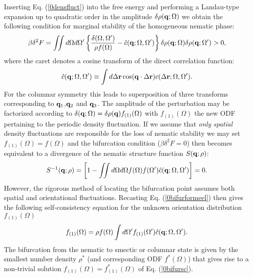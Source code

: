 \documentclass[amssymb]{revtex4}
\newcommand{\bfr}{{\bf r}}
\newcommand{\vq}{{\bf q}}
\begin{document}
Inserting Eq. (\ref{0densfluct}) into the free energy and performing a Landau-type expansion up to quadratic order
in the amplitude $\delta \rho(\vq;\Omega)$ we obtain the following condition for marginal stability of the homogeneous nematic phase: 
\begin{equation}
\beta \delta ^{2} F= \iint d\Omega d\Omega^{\prime} \left\{
\frac{\delta(\Omega,\Omega^{\prime})}{\rho f(\Omega)}-\hat{c}(\vq;\Omega,\Omega^{\prime})
\right\}\delta \rho (\vq;\Omega)\delta \rho (\vq;\Omega^{\prime})>0, \label{0bifurformeel}
\end{equation}
where the caret denotes a cosine transform  of the direct correlation function:
\begin{equation}
\hat{c}(\vq;\Omega,\Omega^{\prime})\equiv \int d\Delta \bfr 
\cos(\vq \cdot \Delta \bfr) c(\Delta \bfr;\Omega,\Omega^{\prime}).  
\end{equation}
For the columnar symmetry this leads to superposition of three transforms corresponding to $\vq_{1}$,$\vq_{2}$
and $\vq_{3}$.
The amplitude of the perturbation may be factorized according to
$\delta(\vq;\Omega)=\delta \rho (\vq)f_{(1)}(\Omega)$ with $f_{(1)}(\Omega)$ the
new ODF pertaining to the periodic density fluctuation.
If we assume that {\em only spatial} density fluctuations are responsible
for the loss of nematic stability  we may set $f_{(1)}(\Omega)=f(\Omega)$
and the bifurcation condition ($\beta\delta^{2}F=0$) then becomes
equivalent to a divergence of the nematic structure function $S(\vq;\rho)$:
\begin{equation}
S^{-1}(\vq;\rho)=\left[1-\iint d\Omega d\Omega f(\Omega)f(\Omega^{\prime}) \hat{c}(\vq;\Omega,\Omega^{\prime}) \right]=0.
\label{0divstruct}
\end{equation}
However, the rigorous method of locating
the bifurcation point assumes both spatial and orientational fluctuations.
Recasting Eq. (\ref{0bifurformeel}) then gives
the following self-consistency equation for the unknown orientation distribution  
$f_{(1)}(\Omega)$
\begin{equation}
f_{(1)}(\Omega)= \rho f(\Omega) \int d\Omega ^{\prime} f_{(1)}(\Omega ^{\prime})
\hat{c}(\vq;\Omega,\Omega ^{\prime}). \label{0bifursc}
\end{equation}
The bifurcation from the nematic to smectic or columnar state
is given by the smallest number density $\rho^{\ast}$ (and corresponding
ODF $f^{\ast}(\Omega)$) that gives rise to a non-trivial solution 
$f_{(1)}(\Omega)=f_{(1)}^{\ast}(\Omega)$ of Eq. (\ref{0bifursc}).
\end{document}
